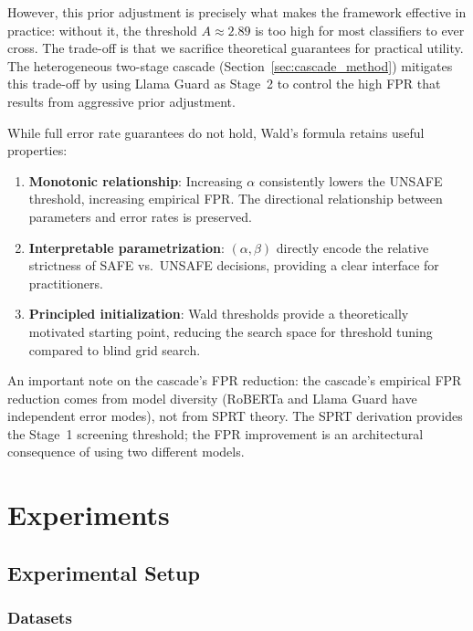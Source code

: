 \documentclass[acmtjournal, acmnowidth]{acmart}
\theoremstyle{definition}
\begin{document}
However, this prior adjustment is precisely what makes the framework effective in practice: without it, the threshold $A \approx 2.89$ is too high for most classifiers to ever cross. The trade-off is that we sacrifice theoretical guarantees for practical utility. The heterogeneous two-stage cascade (Section~\ref{sec:cascade_method}) mitigates this trade-off by using Llama Guard as Stage~2 to control the high FPR that results from aggressive prior adjustment.

While full error rate guarantees do not hold, Wald's formula retains useful properties:

\begin{enumerate}
    \item \textbf{Monotonic relationship}: Increasing $\alpha$ consistently lowers the UNSAFE threshold, increasing empirical FPR. The directional relationship between parameters and error rates is preserved.
    \item \textbf{Interpretable parametrization}: $(\alpha, \beta)$ directly encode the relative strictness of SAFE vs.\ UNSAFE decisions, providing a clear interface for practitioners.
    \item \textbf{Principled initialization}: Wald thresholds provide a theoretically motivated starting point, reducing the search space for threshold tuning compared to blind grid search.
\end{enumerate}

An important note on the cascade's FPR reduction: the cascade's empirical FPR reduction comes from model diversity (RoBERTa and Llama Guard have independent error modes), not from SPRT theory. The SPRT derivation provides the Stage~1 screening threshold; the FPR improvement is an architectural consequence of using two different models.

\section{Experiments}

\subsection{Experimental Setup}

\subsubsection{Datasets}
\end{document}
